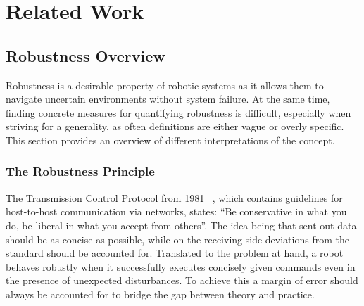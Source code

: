 \setcounter{chapter}{1}

\chapter{Related Work}


\section{Robustness Overview} \label{Robustness Overview}
Robustness is a desirable property of robotic systems as it allows them to navigate uncertain environments without system failure. At the same time, finding concrete measures for quantifying robustness is difficult, especially when striving for a generality, as often definitions are either vague or overly specific.
This section provides an overview of different interpretations of the concept. 



\subsection{The Robustness Principle} \label{The Robustness Principle}
The Transmission Control Protocol from 1981 ~\cite{trm}, which contains guidelines for host-to-host communication via networks, states: “Be conservative in what you do, be liberal in what you accept from others”. The idea being that sent out data should be as concise as possible, while on the receiving side deviations from the standard should be accounted for. Translated to the problem at hand, a robot behaves robustly when it successfully executes concisely given commands even in the presence of unexpected disturbances. To achieve this a margin of error should always be accounted for to bridge the gap between theory and practice.




